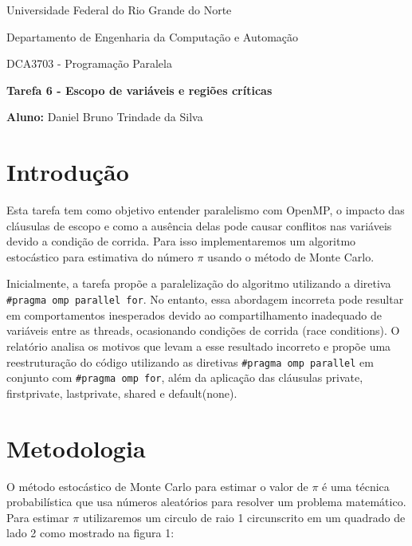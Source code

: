 \documentclass[a4paper, 12pt]{article}
\begin{document}
	\begin{center}
		Universidade Federal do Rio Grande do Norte
		
		Departamento de Engenharia da Computação e Automação
		
		DCA3703 - Programação Paralela
		
		\textbf{Tarefa 6 - Escopo de variáveis e regiões críticas}
		
		\textbf{Aluno:} Daniel Bruno Trindade da Silva
	\end{center}
	
	\section{Introdução}
	\hspace{.7cm}Esta tarefa tem como objetivo entender paralelismo com OpenMP, o impacto das cláusulas de escopo e como a ausência delas pode causar conflitos nas variáveis devido a condição de corrida. Para isso implementaremos um algoritmo estocástico para estimativa do número $\pi$ usando o método de Monte Carlo.
	
	Inicialmente, a tarefa propõe a paralelização do algoritmo utilizando a diretiva \texttt{\#pragma omp parallel for}. No entanto, essa abordagem incorreta pode resultar em comportamentos inesperados devido ao compartilhamento inadequado de variáveis entre as threads, ocasionando condições de corrida (race conditions). O relatório analisa os motivos que levam a esse resultado incorreto e propõe uma reestruturação do código utilizando as diretivas \texttt{\#pragma omp parallel} em conjunto com \texttt{\#pragma omp for}, além da aplicação das cláusulas private, firstprivate, lastprivate, shared e default(none).
	
	\section{Metodologia}
	\hspace{.7cm}O método estocástico de Monte Carlo para estimar o valor de $\pi$ é uma técnica probabilística que usa números aleatórios para resolver um problema matemático. Para estimar $\pi$ utilizaremos um circulo de raio 1 circunscrito em um quadrado de lado 2 como mostrado na figura 1: 
	
\end{document}
